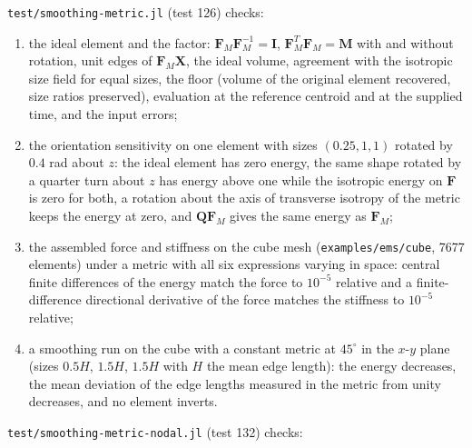\documentclass[11pt]{article}
\newcommand{\bs}[1]{\boldsymbol{#1}}
\newcommand{\code}[1]{\texttt{#1}}
\begin{document}
\code{test/smoothing-metric.jl} (test 126) checks:
\begin{enumerate}[itemsep=2pt]
\item the ideal element and the factor: $\bs F_M \bs F_M^{-1} = \bs I$,
  $\bs F_M^T \bs F_M = \bs M$ with and without rotation, unit edges of
  $\bs F_M \bs X$, the ideal volume, agreement with the isotropic size
  field for equal sizes, the floor (volume of the original element
  recovered, size ratios preserved), evaluation at the reference centroid
  and at the supplied time, and the input errors;
\item the orientation sensitivity on one element with sizes
  $(0.25, 1, 1)$ rotated by $0.4$ rad about $z$: the ideal element has
  zero energy, the same shape rotated by a quarter turn about $z$ has
  energy above one while the isotropic energy on $\bs F$ is zero for
  both, a rotation about the axis of transverse isotropy of the metric
  keeps the energy at zero, and $\bs Q \bs F_M$ gives the same energy as
  $\bs F_M$;
\item the assembled force and stiffness on the cube mesh
  (\code{examples/ems/cube}, 7677 elements) under a metric with all six
  expressions varying in space: central finite differences of the energy
  match the force to $10^{-5}$ relative and a finite-difference
  directional derivative of the force matches the stiffness to
  $10^{-5}$ relative;
\item a smoothing run on the cube with a constant metric at
  $45^\circ$ in the $x$-$y$ plane (sizes $0.5H$, $1.5H$, $1.5H$ with $H$
  the mean edge length): the energy decreases, the mean deviation of the
  edge lengths measured in the metric from unity decreases, and no
  element inverts.
\end{enumerate}
\code{test/smoothing-metric-nodal.jl} (test 132) checks:
\end{document}

